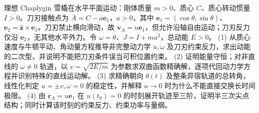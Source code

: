 理想 Chaplygin 雪橇在水平平面运动：刚体质量 \(m>0\)、质心 \(C\)、质心转动惯量 \(I>0\)。刀刃接触点为 \(A=C-a\mathbf e_1\)，\(a>0\)，其中 \(\mathbf e_1=(\cos\theta,\sin\theta)\)、\(\mathbf e_2=\hat{\mathbf z}\times\mathbf e_1\)。刀刃禁止横向滑动，故 \(\mathbf v_A=u\mathbf e_1\)，但允许沿轴自由运动；刀刃反力仅沿 \(\mathbf e_2\)，无其他水平外力。令 \(\omega=\dot\theta\)、\(J=I+ma^2\)，总动能 \(E>0\)。
(1) 从质心速度与牛顿平动、角动量方程推导非完整动力学 \(\dot u,\dot\omega\) 及刀刃约束反力，求出动能的二次型，并说明不能把刀刃条件误当可积位置约束。
(2) 证明能量守恒；对非直线的 \(\omega\ne0\) 轨道，以 \(v=\sqrt{2E/m}\) 为参数求双曲函数精确解，逐项代回动力学方程并识别特殊的直线运动解。
(3) 求精确朝向 \(\theta(t)\) 及整条异宿轨道的总转角，线性化判定 \(u=\pm v,\omega=0\) 的稳定性，并解释 \(a\to0\) 时为什么不能直接交换长时间极限。
(4) 由 \(\dot{\mathbf r}_A=u\mathbf e_1\) 在 \(u(t_0)=0\) 的时刻展开轨迹至三阶，证明半三次尖点结构；同时计算该时刻的约束反力、约束功率与量纲。
